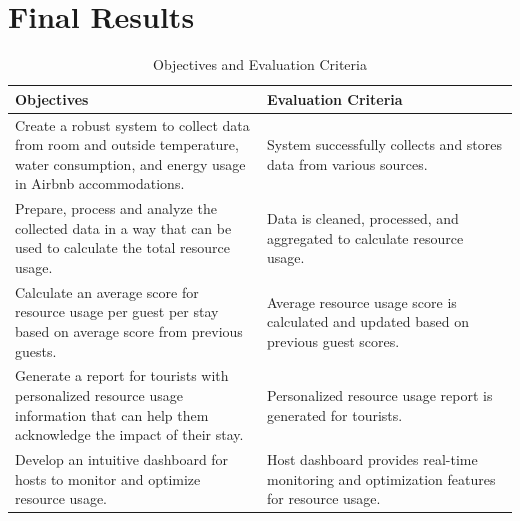 
\chapter{Final Results}



\begin{table}[htbp]
    \centering
    \caption{Objectives and Evaluation Criteria}
    \begin{tabular}{|p{0.5\linewidth}|p{0.5\linewidth}|}
        \hline
        \textbf{Objectives} & \textbf{Evaluation Criteria} \\
        \hline
        Create a robust system to collect data from room and outside temperature, water consumption, and energy usage in Airbnb accommodations. & System successfully collects and stores data from various sources. \\
        \hline
        Prepare, process and analyze the collected data in a way that can be used to calculate the total resource usage. & Data is cleaned, processed, and aggregated to calculate resource usage. \\
        \hline
        Calculate an average score for resource usage per guest per stay based on average score from previous guests. & Average resource usage score is calculated and updated based on previous guest scores. \\
        \hline
        Generate a report for tourists with personalized resource usage information that can help them acknowledge the impact of their stay. & Personalized resource usage report is generated for tourists. \\
        \hline
        Develop an intuitive dashboard for hosts to monitor and optimize resource usage. & Host dashboard provides real-time monitoring and optimization features for resource usage. \\
        \hline
    \end{tabular}
\end{table}